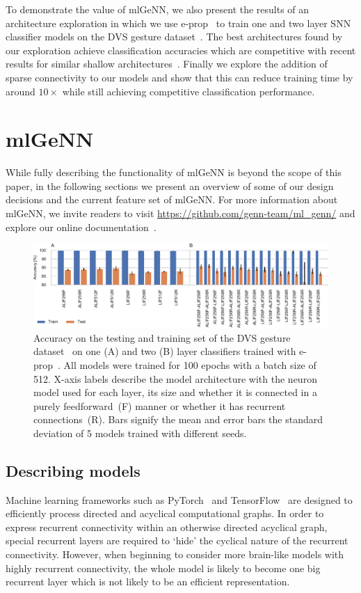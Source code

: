 \documentclass[sigconf]{acmart}
\begin{document}
To demonstrate the value of mlGeNN, we also present the results of an architecture exploration in which we use e-prop~\citep{Bellec2020} to train one and two layer SNN classifier models on the DVS gesture dataset~\citep{amir_low_2017}.
The best architectures found by our exploration achieve classification accuracies which are competitive with recent results for similar shallow architectures~\citep{subramoney2022egru,yin2021accurate}.
Finally we explore the addition of sparse connectivity to our models and show that this can reduce training time by around $10\times$ while still achieving competitive classification performance.

\section{mlGeNN}
While fully describing the functionality of mlGeNN is beyond the scope of this paper, in the following sections we present an overview of some of our design decisions and the current feature set of mlGeNN.
For more information about mlGeNN, we invite readers to visit \url{https://github.com/genn-team/ml_genn/} and explore our online documentation~\citep{mlgenn_docs}.

\begin{figure}[t]
  \centering
  \includegraphics{figures/dense_accuracy.pdf}
  \caption{Accuracy on the testing and training set of the DVS gesture dataset~\citep{amir_low_2017} on one (A) and two (B) layer classifiers trained with e-prop~\citep{Bellec2020}.
  All models were trained for 100 epochs with a batch size of 512.
  X-axis labels describe the model architecture with the neuron model used for each layer, its size and whether it is connected in a purely feedforward~(F) manner or whether it has recurrent connections~(R).
  Bars signify the mean and error bars the standard deviation of 5 models trained with different seeds.}
  \label{fig:dense_accuracy}
\end{figure}

\subsection{Describing models}
Machine learning frameworks such as PyTorch~\citep{paszke2019pytorch} and TensorFlow~\citep{TensorFlow} are designed to efficiently process directed and acyclical computational graphs.
In order to express recurrent connectivity within an otherwise directed acyclical graph, special recurrent layers are required to `hide' the cyclical nature of the recurrent connectivity.
However, when beginning to consider more brain-like models with highly recurrent connectivity, the whole model is likely to become one big recurrent layer which is not likely to be an efficient representation.
\end{document}
